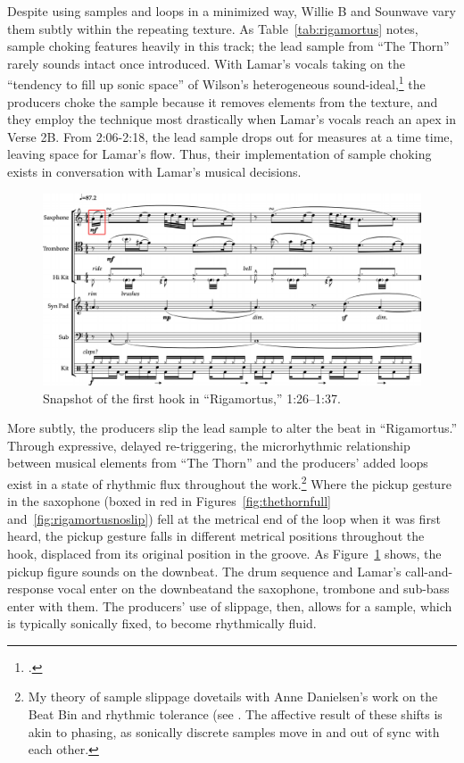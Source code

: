 Despite using samples and loops in a minimized way, Willie B and Sounwave vary them subtly
within the repeating texture. As Table~\ref{tab:rigamortus} notes, sample choking features
heavily in this track; the lead sample from ``The Thorn'' rarely sounds intact once introduced.
With Lamar's vocals taking on the ``tendency to fill up sonic space'' of Wilson's heterogeneous
sound-ideal,\footnote{
    \autocite[328]{ollywilsonHeterogeneousSoundIdeal1992}.} 
the producers choke the sample because it removes elements from the texture, and they employ
the technique most drastically when Lamar's vocals reach an apex in Verse 2B. From 2:06-2:18,
the lead sample drops out for measures at a time time, leaving space for Lamar's flow. Thus,
their implementation of sample choking exists in conversation with Lamar's musical decisions.

\begin{figure}[htp]
    \centering
    \includegraphics[width=\textwidth]{images/figures/chp 02/126137rigamortusslip.pdf}
    \caption{Snapshot of the first hook in ``Rigamortus,'' 1:26--1:37.}
    \label{fig:rigamortusslip}
\end{figure}

More subtly, the producers slip the lead sample to alter the beat in ``Rigamortus.'' Through
expressive, delayed re-triggering, the microrhythmic relationship between musical elements from
``The Thorn'' and the producers' added loops exist in a state of rhythmic flux throughout the
work.\footnote{
    My theory of sample slippage dovetails with Anne Danielsen's work on the Beat Bin and 
    rhythmic tolerance (see \autocite[29\textit{ff}.]{annedanielsenHereThereEverywhere2016}. 
    The affective result of these shifts is akin to phasing, as sonically discrete samples 
    move in and out of sync with each other.}
Where the pickup gesture in the saxophone (boxed in red in Figures~\ref{fig:thethornfull}
and~\ref{fig:rigamortusnoslip}) fell at the metrical end of the loop when it was first heard,
the pickup gesture falls in different metrical positions throughout the hook, displaced from
its original position in the groove. As Figure~\ref{fig:rigamortusslip} shows, the pickup 
figure sounds on the downbeat. The drum sequence and Lamar's call-and-response vocal enter 
on the downbeat\textemdash and the saxophone, trombone and sub-bass enter with them. The 
producers' use of slippage, then, allows for a sample, which is typically sonically fixed,
to become rhythmically fluid.

